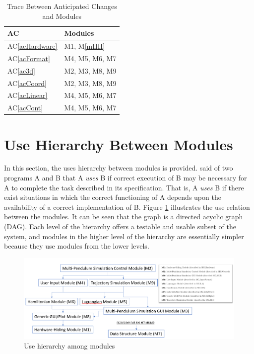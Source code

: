 \documentclass[12pt, titlepage]{article}
\newcommand{\acref}[1]{AC\ref{#1}}
\newcommand{\mref}[1]{M\ref{#1}}
\begin{document}
\begin{table}[H]
\centering
\begin{tabular}{p{} p{}}
\toprule
\textbf{AC} & \textbf{Modules}\\
\midrule
\acref{acHardware} & M1, \mref{mHH}\\
\acref{acFormat} & M4, M5, M6, M7\\%
\acref{ac3d} & M2, M3, M8, M9\\%
\acref{acCoord} & M2, M3, M8, M9\\%
\acref{acLinear} & M4, M5, M6, M7\\%
\acref{acCont} & M4, M5, M6, M7\\%
\bottomrule
\end{tabular}
\caption{Trace Between Anticipated Changes and Modules}
\label{TblACT}
\end{table}

\section{Use Hierarchy Between Modules} \label{SecUse}

In this section, the uses hierarchy between modules is provided. 
\citet{Parnas1978} said of two programs A and B that A {\em uses} B if
correct execution of B may be necessary for A to complete the task described in
its specification. That is, A {\em uses} B if there exist situations in which
the correct functioning of A depends upon the availability of a correct
implementation of B.  Figure \ref{FigUH} illustrates the use relation between
the modules. It can be seen that the graph is a directed acyclic graph
(DAG). Each level of the hierarchy offers a testable and usable subset of the
system, and modules in the higher level of the hierarchy are essentially 
simpler because they use modules from the lower levels.

\begin{figure}[H]
\centering
\includegraphics[width=1.0\textwidth]{figure1.PNG}
\caption{Use hierarchy among modules}
\label{FigUH}
\end{figure}
\end{document}
